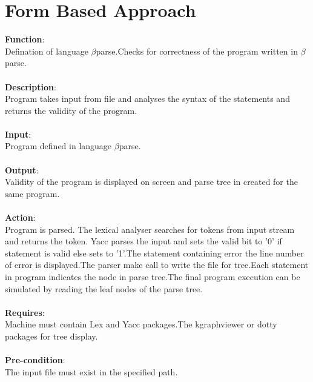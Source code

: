 \documentclass[12pt, oneside, a4paper]{article}
\begin{document}
\section{Form Based Approach}
\textbf{Function}:\\Defination of language $\beta$parse.Checks for correctness of the program written in $\beta$parse.\\\\
\textbf{Description}:\\
Program takes input from file and analyses the syntax of the statements and returns the validity of the program.\\\\
\textbf{Input}:\\ Program defined in language $\beta$parse.\\\\
\textbf{Output}:\\Validity of the program is displayed on screen and parse tree in created for the same program.\\\\
\textbf{Action}:\\
Program is parsed. The lexical analyser searches for tokens from input stream 
and returns the token. Yacc parses the input and sets the valid bit to '0' if statement is valid else sets to '1'.The statement containing error the line number of error is displayed.The parser make call to write the file for tree.Each statement in program indicates the node in parse tree.The final program execution can be simulated by reading the leaf nodes of the parse tree.\\\\
\textbf{Requires}:\\Machine must contain Lex and Yacc packages.The kgraphviewer or dotty packages for tree display.\\\\
\textbf{Pre-condition}:\\The input file must exist in the specified path.\\
\end{document}
